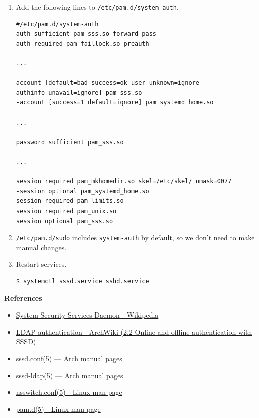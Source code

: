 \documentclass[12pt, a4paper]{article}
\begin{document}
\begin{enumerate}[label=(\alph*)]
\begin{enumerate}[label=(\arabic*)]
      \pagebreak
      \item Add the following lines to \verb|/etc/pam.d/system-auth|.
      \begin{Verbatim}[frame=single, fontsize=\footnotesize, breaklines]
#/etc/pam.d/system-auth
auth sufficient pam_sss.so forward_pass
auth required pam_faillock.so preauth

...

account [default=bad success=ok user_unknown=ignore authinfo_unavail=ignore] pam_sss.so
-account [success=1 default=ignore] pam_systemd_home.so

...

password sufficient pam_sss.so

...

session required pam_mkhomedir.so skel=/etc/skel/ umask=0077
-session optional pam_systemd_home.so
session required pam_limits.so
session required pam_unix.so
session optional pam_sss.so
      \end{Verbatim}

      \item \verb|/etc/pam.d/sudo| includes \verb|system-auth| by default, so
      we don't need to make manual changes.

      \item Restart services.
      \begin{Verbatim}[frame=single]
$ systemctl sssd.service sshd.service
      \end{Verbatim}
    \end{enumerate}

    \textbf{References}
    \begin{itemize}
      \item \href{https://en.wikipedia.org/wiki/System_Security_Services_Daemon}{System Security Services Daemon - Wikipedia}
      \item \href{https://wiki.archlinux.org/title/LDAP_authentication#Online_and_offline_authentication_with_SSSD}{LDAP authentication - ArchWiki (2.2 Online and offline authentication with SSSD)}
      \item \href{https://man.archlinux.org/man/sssd.conf.5}{sssd.conf(5) — Arch manual pages}
      \item \href{https://man.archlinux.org/man/sssd-ldap.5.en}{sssd-ldap(5) — Arch manual pages}
      \item \href{https://linux.die.net/man/5/nsswitch.conf}{nsswitch.conf(5) - Linux man page}
      \item \href{https://linux.die.net/man/5/pam.d}{pam.d(5) - Linux man page}
    \end{itemize}


\end{enumerate}
\end{document}
